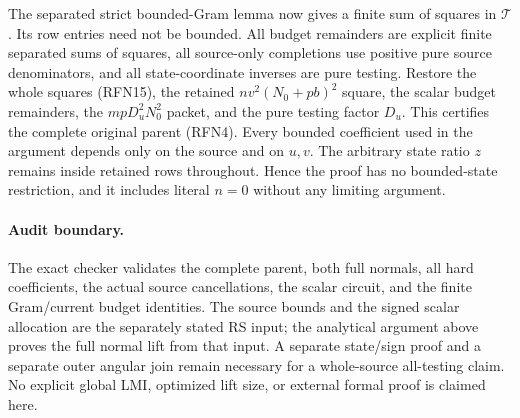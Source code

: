 The separated strict bounded-Gram lemma now gives a finite sum of
squares in $\mathcal T$.  Its row entries need not be bounded.  All
budget remainders are explicit finite separated sums of squares, all
source-only completions use positive pure source denominators, and
all state-coordinate inverses are pure testing.  Restore the whole
squares (RFN15), the retained $nv^2(N_0+pb)^2$ square, the scalar
budget remainders, the $mpD_u^2N_0^2$ packet, and the pure testing
factor $D_u$.  This certifies the complete original parent (RFN4).
Every bounded coefficient used in the argument depends only on the
source and on $u,v$.  The arbitrary state ratio $z$ remains inside
retained rows throughout.  Hence the proof has no bounded-state
restriction, and it includes literal $n=0$ without any limiting
argument.

\paragraph{Audit boundary.}
The exact checker validates the complete parent, both full normals,
all hard coefficients, the actual source cancellations, the scalar
circuit, and the finite Gram/current budget identities.  The source
bounds and the signed scalar allocation are the separately stated RS
input; the analytical argument above proves the full normal lift
from that input.  A separate state/sign proof and a separate outer
angular join remain necessary for a whole-source all-testing claim.
No explicit global LMI, optimized lift size, or external formal proof
is claimed here.
